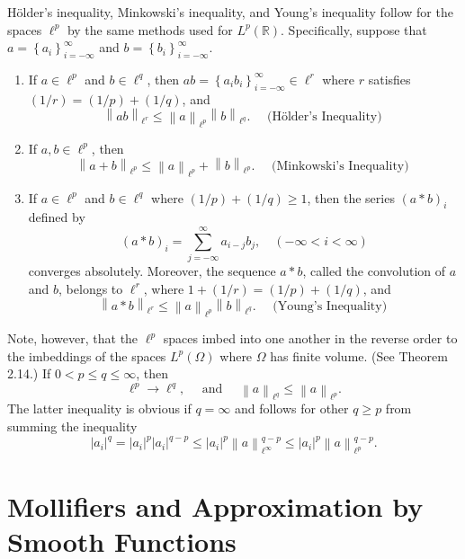 Hölder's inequality, Minkowski's inequality, and Young's inequality follow for the spaces $\ell^p$ by the same methods used for $L^p(\mathbb{R})$. Specifically, suppose that $a=\left\{a_i\right\}_{i=-\infty}^{\infty}$ and $b=\left\{b_i\right\}_{i=-\infty}^{\infty}$.
\begin{enumerate}[label = (\alph*)]
  \item If $a \in \ell^p$ and $b \in \ell^q$, then $a b=\left\{a_i b_i\right\}_{i=-\infty}^{\infty} \in \ell^r$ where $r$ satisfies $(1 / r)=(1 / p)+(1 / q)$, and
  \[
  \left\|a b\right\|_{\ell^r} \leq\left\|a\right\|_{\ell^p}\left\|b\right\|_{\ell^q} . \quad \text { (Hölder's Inequality) }
  \]
  \item If $a, b \in \ell^p$, then
  \[
  \left\|a+b\right\|_{\ell^p} \leq\left\|a\right\|_{\ell^p}+\left\|b\right\|_{\ell^p} . \quad \text { (Minkowski's Inequality) }
  \]
  \item If $a \in \ell^p$ and $b \in \ell^q$ where $(1 / p)+(1 / q) \geq 1$, then the series $(a * b)_i$ defined by
  \[
  (a * b)_i=\sum_{j=-\infty}^{\infty} a_{i-j} b_j, \quad(-\infty<i<\infty)
  \]
  converges absolutely. Moreover, the sequence $a * b$, called the convolution of $a$ and $b$, belongs to $\ell^r$, where $1+(1 / r)=(1 / p)+(1 / q)$, and
  \[
  \left\|a * b\right\|_{\ell^r} \leq\left\|a\right\|_{\ell^p}\left\|b\right\|_{\ell^q} . \quad \text { (Young's Inequality) }
  \]
\end{enumerate}

Note, however, that the $\ell^p$ spaces imbed into one another in the reverse order to the imbeddings of the spaces $L^p(\Omega)$ where $\Omega$ has finite volume. (See Theorem 2.14.) If $0<p \leq q \leq \infty$, then
\[
\ell^p \rightarrow \ell^q, \quad \text { and } \quad\left\|a\right\|_{\ell^q} \leq\left\|a\right\|_{\ell^p} .
\]
The latter inequality is obvious if $q=\infty$ and follows for other $q \geq p$ from summing the inequality
\[
\left|a_i\right|^q=\left|a_i\right|^p\left|a_i\right|^{q-p} \leq\left|a_i\right|^p\left\|a\right\|_{\ell^{\infty}}^{q-p} \leq\left|a_i\right|^p\left\|a\right\|_{\ell^p}^{q-p} .
\]


\section{Mollifiers and Approximation by Smooth Functions}

